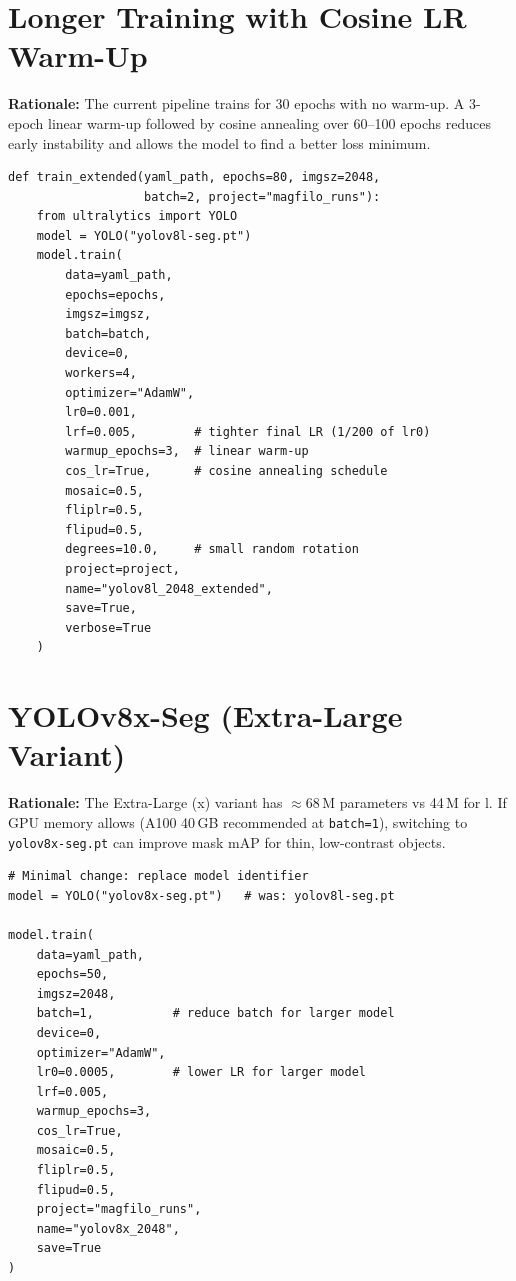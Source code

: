 \documentclass[11pt,a4paper,openany]{report}
\begin{document}
\section{Longer Training with Cosine LR Warm-Up}

\textbf{Rationale:} The current pipeline trains for 30 epochs with no warm-up. A 3-epoch linear
warm-up followed by cosine annealing over 60--100 epochs reduces early instability and allows
the model to find a better loss minimum.

\begin{lstlisting}[caption={Extended training with warm-up and cosine LR},label={lst:lr_warmup}]
def train_extended(yaml_path, epochs=80, imgsz=2048,
                   batch=2, project="magfilo_runs"):
    from ultralytics import YOLO
    model = YOLO("yolov8l-seg.pt")
    model.train(
        data=yaml_path,
        epochs=epochs,
        imgsz=imgsz,
        batch=batch,
        device=0,
        workers=4,
        optimizer="AdamW",
        lr0=0.001,
        lrf=0.005,        # tighter final LR (1/200 of lr0)
        warmup_epochs=3,  # linear warm-up
        cos_lr=True,      # cosine annealing schedule
        mosaic=0.5,
        fliplr=0.5,
        flipud=0.5,
        degrees=10.0,     # small random rotation
        project=project,
        name="yolov8l_2048_extended",
        save=True,
        verbose=True
    )
\end{lstlisting}

\section{YOLOv8x-Seg (Extra-Large Variant)}

\textbf{Rationale:} The Extra-Large (x) variant has $\approx$68\,M parameters vs 44\,M for l.
If GPU memory allows (A100 40\,GB recommended at \texttt{batch=1}), switching to
\texttt{yolov8x-seg.pt} can improve mask mAP for thin, low-contrast objects.

\begin{lstlisting}[caption={Switching to YOLOv8x-Seg},label={lst:yolov8x}]
# Minimal change: replace model identifier
model = YOLO("yolov8x-seg.pt")   # was: yolov8l-seg.pt

model.train(
    data=yaml_path,
    epochs=50,
    imgsz=2048,
    batch=1,           # reduce batch for larger model
    device=0,
    optimizer="AdamW",
    lr0=0.0005,        # lower LR for larger model
    lrf=0.005,
    warmup_epochs=3,
    cos_lr=True,
    mosaic=0.5,
    fliplr=0.5,
    flipud=0.5,
    project="magfilo_runs",
    name="yolov8x_2048",
    save=True
)
\end{lstlisting}
\end{document}
